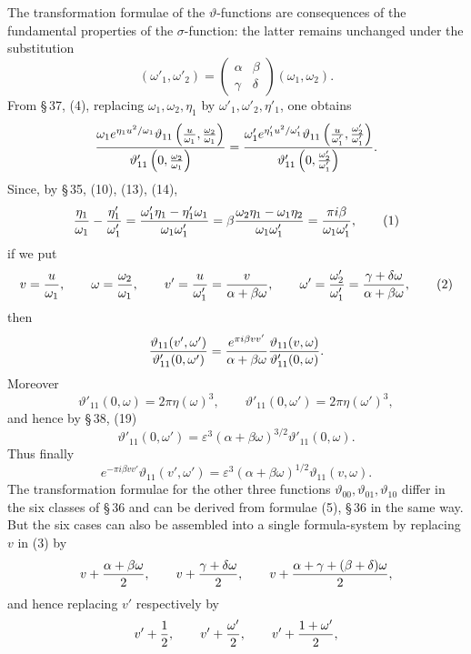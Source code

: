 \documentclass[11pt]{article}
\providecommand{\tht}{\vartheta}
\begin{document}
The transformation formulae of the $\vartheta$-functions are consequences of the fundamental properties of the $\sigma$-function: the latter remains unchanged under the substitution
\[
(\omega'_1,\omega'_2)=
\begin{pmatrix}\alpha&\beta\\ \gamma&\delta\end{pmatrix}(\omega_1,\omega_2).
\]
From \S\,37, (4), replacing $\omega_1,\omega_2,\eta_1$ by $\omega'_1,\omega'_2,\eta'_1$, one obtains
\[
{\omega_1 e^{\eta_1u^2/\omega_1}\tht_{11}\left({u\over\omega_1},{\omega_2\over\omega_1}\right)
\over \tht'_{11}\left(0,{\omega_2\over\omega_1}\right)}
=
{\omega'_1 e^{\eta'_1u^2/\omega'_1}\tht_{11}\left({u\over\omega'_1},{\omega'_2\over\omega'_1}\right)
\over \tht'_{11}\left(0,{\omega'_2\over\omega'_1}\right)}.
\]
Since, by \S\,35, (10), (13), (14),
\begin{equation}
{\eta_1\over\omega_1}-{\eta'_1\over\omega'_1}
={\omega'_1\eta_1-\eta'_1\omega_1\over\omega_1\omega'_1}
=\beta{\omega_2\eta_1-\omega_1\eta_2\over\omega_1\omega'_1}
={\pi i\beta\over\omega_1\omega'_1},
\tag{1}
\end{equation}
if we put
\begin{equation}
 v={u\over\omega_1},
\qquad
\omega={\omega_2\over\omega_1},
\qquad
v'={u\over\omega'_1}={v\over\alpha+
\beta\omega},
\qquad
\omega'={\omega'_2\over\omega'_1}={\gamma+\delta\omega\over\alpha+
\beta\omega},
\tag{2}
\end{equation}
then
\[
{\tht_{11}(v',\omega')\over\tht'_{11}(0,\omega')}
={e^{\pi i\beta vv'}
\over\alpha+
\beta\omega}
{\tht_{11}(v,\omega)\over\tht'_{11}(0,\omega)}.
\]
Moreover
\[
\tht'_{11}(0,\omega)=2\pi\eta(\omega)^3,
\qquad
\tht'_{11}(0,\omega')=2\pi\eta(\omega')^3,
\]
and hence by \S\,38, (19)
\[
\tht'_{11}(0,\omega')=\varepsilon^3(\alpha+
\beta\omega)^{3/2}\tht'_{11}(0,
\omega).
\]
Thus finally
\begin{equation}
e^{-\pi i\beta vv'}\tht_{11}(v',\omega')=\varepsilon^3(\alpha+
\beta\omega)^{1/2}\tht_{11}(v,
\omega).
\tag{3}
\end{equation}
The transformation formulae for the other three functions $\tht_{00},\tht_{01},\tht_{10}$ differ in the six classes of \S\,36 and can be derived from formulae (5), \S\,36 in the same way. But the six cases can also be assembled into a single formula-system by replacing $v$ in (3) by
\[
v+{\alpha+
\beta\omega\over2},
\qquad
v+{\gamma+\delta\omega\over2},
\qquad
v+{\alpha+
\gamma+(
\beta+
\delta)\omega\over2},
\]
and hence replacing $v'$ respectively by
\[
v'+{1\over2},
\qquad v'+{\omega'\over2},
\qquad v'+{1+
\omega'\over2},
\]
\end{document}
